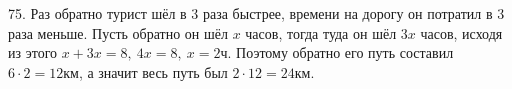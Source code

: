 75. Раз обратно турист шёл в 3 раза быстрее, времени на дорогу он потратил в 3 раза меньше. Пусть обратно он шёл $x$ часов, тогда туда он шёл $3x$ часов, исходя из этого $x+3x=8,\ 4x=8,\ x=2$ч. Поэтому обратно его путь составил $6\cdot2=12$км, а значит весь путь был $2\cdot12=24$км.\\

